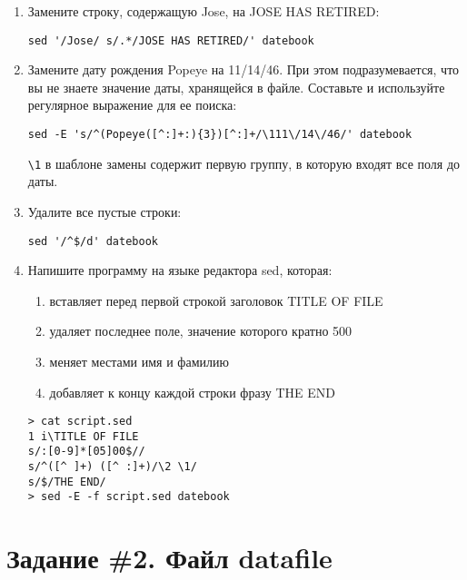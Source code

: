 \documentclass[listings]{labreport}
\begin{document}
\begin{enumerate}
\item Замените строку, содержащую Jose, на JOSE HAS RETIRED:
\begin{verbatim}
sed '/Jose/ s/.*/JOSE HAS RETIRED/' datebook
\end{verbatim}

\item Замените дату рождения Popeye на 11/14/46. При этом подразумевается, что вы не знаете значение даты, хранящейся в файле. Составьте и используйте регулярное выражение для ее поиска:
\begin{verbatim}
sed -E 's/^(Popeye([^:]+:){3})[^:]+/\111\/14\/46/' datebook
\end{verbatim}

\begin{small}
  \verb|\1| в шаблоне замены содержит первую группу, в которую входят все поля до даты.
\end{small}

\item Удалите все пустые строки:
\begin{verbatim}
sed '/^$/d' datebook
\end{verbatim}

\item Напишите программу на языке редактора sed, которая:
\begin{small}
\begin{enumerate}
\item вставляет перед первой строкой заголовок TITLE OF FILE
\item удаляет последнее поле, значение которого кратно 500
\item меняет местами имя и фамилию
\item добавляет к концу каждой строки фразу THE END
\end{enumerate}
\end{small}
\begin{verbatim}
> cat script.sed
1 i\TITLE OF FILE
s/:[0-9]*[05]00$//
s/^([^ ]+) ([^ :]+)/\2 \1/
s/$/THE END/
> sed -E -f script.sed datebook
\end{verbatim}

\end{enumerate}

\section*{Задание \#2. Файл datafile}
\end{document}

